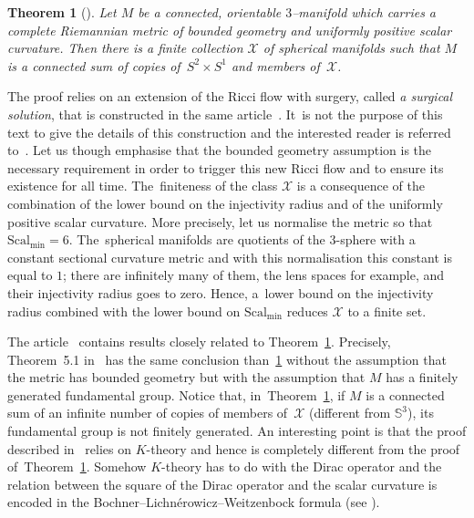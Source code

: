 \documentclass[pdftex]{sigma}
\numberwithin{equation}{section}
\newtheorem{theor}{Theorem}[section]
\def\Smin{\textrm{Scal}_\mathrm{min}}
\begin{document}
\begin{theor}[\cite{BBM}]\label{thm:positive scalar general}
Let $M$ be a connected, orientable $3$--manifold which carries a complete
Riemannian metric of bounded
geometry and uniformly positive scalar curvature. Then there is a finite collection $\mathcal X$ of spherical manifolds such that $M$ is a connected sum of copies of~$S^2\times S^1$ and members of~$\mathcal X$.
\end{theor}

The proof relies on an extension of the Ricci flow with surgery, called {\it a surgical solution}, that is constructed in the same article~\cite{BBM}. It~is not the purpose of this text to give the details of this construction and the interested reader is referred to~\cite{BBM}. Let us though emphasise that the bounded geometry assumption is the necessary requirement in order to trigger this new Ricci flow and to ensure its existence for all time. The~finiteness of the class $\mathcal X$ is a consequence
of the combination of the lower bound on the injectivity radius and of the uniformly positive scalar curvature. More precisely, let us normalise the metric so that $\Smin = 6$. The~spherical manifolds are quotients of the $3$-sphere with a constant sectional curvature metric and with this
normalisation this constant is equal to $1$; there are infinitely many of
them, the lens spaces for example, and their injectivity radius goes to zero. Hence, a~lower bound on the injectivity radius combined with the lower bound on $\Smin$ reduces $\mathcal X$ to a finite set.

The article~\cite{cwy:taming} contains results closely related to Theorem~\ref{thm:positive scalar general}. Precisely, Theorem~5.1 in~\cite{cwy:taming} has the same conclusion than~\ref{thm:positive scalar general} without the assumption that the metric has bounded geometry but with the assumption that $M$ has a finitely generated fundamental group. Notice that, in~Theorem~\ref{thm:positive scalar general}, if $M$ is a connected sum of
an infinite number of copies of members of~$\mathcal X$ (different from $\mathbb{S}^3$), its fundamental group is not finitely generated. An interesting point is that the proof described in~\cite{cwy:taming} relies on $K$-theory and hence is completely different from the proof of~Theorem~\ref{thm:positive scalar general}. Somehow $K$-theory has to do with the Dirac operator and the relation between the square of the Dirac operator and
the scalar curvature is encoded in the Bochner--Lichn\'erowicz--Weitzenbock formula (see \cite[equation~(2.14), p.~112]{GromovLawson}).
\end{document}

